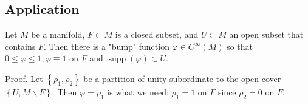 \documentclass[12pt, oneside]{book}
\begin{document}
\subsection{Application}

\begin{theorem}
    Let $M$ be a manifold, $F \subset M$ is a closed subset, and $U \subset M$ an open subset that contains $F$. Then there is a "bump" function $\varphi \in C^{\infty}(M)$ so that $0 \leq \varphi \leq 1, \varphi \equiv 1$ on $F$ and $\operatorname{supp}(\varphi) \subset U$.

    Proof. Let $\left\{\rho_1, \rho_2\right\}$ be a partition of unity subordinate to the open cover $\left\{U, M \backslash F\right\}$. Then $\varphi=\rho_1$ is what we need: $\rho_1=1$ on $F$ since $\rho_2=0$ on $F$.
\end{theorem}
\end{document}
